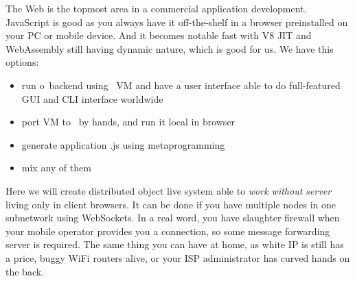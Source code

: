 \clearpage{}\label{jsweb}\secdown

The Web is the topmost area in a commercial application development. JavaScript
is good as you always have it off-the-shelf in a browser preinstalled on your PC
or mobile device. And it becomes notable fast with V8 JIT and WebAssembly still
having dynamic nature, which is good for us. We have this options:
\begin{itemize}[nosep]
  \item run o\F\ backend using \py\ VM and have a user interface able
  to do full-featured GUI and CLI interface worldwide
  \item port VM to \js\ by hands, and run it local in browser
  \item generate application .js using metaprogramming
  \item mix any of them 
\end{itemize}
\pg Here we will create distributed object live system able to \emph{work
without server} living only in client browsers. It can be done if you have
multiple nodes in one subnetwork using WebSockets. In a real word, you have
slaughter firewall when your mobile operator provides you a connection, so some
message forwarding server is required. The same thing you can have at home, as
white IP is still has a price, buggy WiFi routers alive, or your ISP
administrator has curved hands on the back.

\secup
